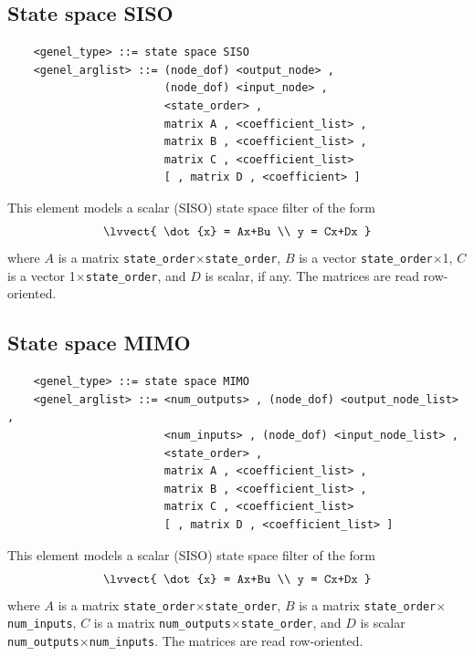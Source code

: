 \documentclass[10pt,dvips]{report}
\begin{document}
\subsection{State space SISO}
\begin{verbatim}
    <genel_type> ::= state space SISO
    <genel_arglist> ::= (node_dof) <output_node> ,
                        (node_dof) <input_node> ,
                        <state_order> ,
                        matrix A , <coefficient_list> ,
                        matrix B , <coefficient_list> ,
                        matrix C , <coefficient_list>
                        [ , matrix D , <coefficient> ]
\end{verbatim}
This element models a scalar (SISO) state space filter of the form
\begin{displaymath}
    \lvvect{ 
        \dot{x} = Ax+Bu \\
	y = Cx+Dx
    }
\end{displaymath}
where $ A $ is a matrix {\tt state\_order}$\times${\tt state\_order},
$ B $ is a vector {\tt state\_order}$\times$1,
$ C $ is a vector 1$\times${\tt state\_order},
and $ D $ is scalar, if any.
The matrices are read row-oriented.

\subsection{State space MIMO}
\begin{verbatim}
    <genel_type> ::= state space MIMO
    <genel_arglist> ::= <num_outputs> , (node_dof) <output_node_list> ,
                        <num_inputs> , (node_dof) <input_node_list> ,
                        <state_order> ,
                        matrix A , <coefficient_list> ,
                        matrix B , <coefficient_list> ,
                        matrix C , <coefficient_list>
                        [ , matrix D , <coefficient_list> ]
\end{verbatim}
This element models a scalar (SISO) state space filter of the form
\begin{displaymath}
    \lvvect{ 
        \dot{x} = Ax+Bu \\
	y = Cx+Dx
    }
\end{displaymath}
where $ A $ is a matrix {\tt state\_order}$\times${\tt state\_order},
$ B $ is a matrix {\tt state\_order}$\times${\tt num\_inputs},
$ C $ is a matrix {\tt num\_outputs}$\times${\tt state\_order},
and $ D $ is scalar {\tt num\_outputs}$\times${\tt num\_inputs}.
The matrices are read row-oriented.
\end{document}
